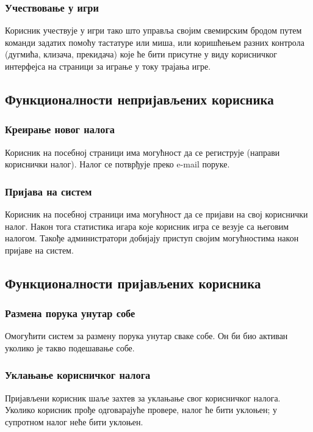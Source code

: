 \subsubsection{Учествовање у игри}
Корисник учествује у игри тако што управља својим свемирским бродом путем команди задатих помоћу тастатуре или
миша, или коришћењем разних контрола (дугмића, клизача, прекидача) које ће бити присутне у виду корисничког
интерфејса на страници за играње у току трајања игре.

\subsection{Функционалности непријављених корисника}

\subsubsection{Креирање новог налога} 
Корисник на посебној страници има могућност да се региструје (направи кориснички налог).
Налог се потврђује преко e-mail поруке.

\subsubsection{Пријава на систем}
Корисник на посебној страници има могућност да се пријави на свој кориснички налог.
Након тога статистика игара које корисник игра се везује са његовим налогом. 
Такође администратори добијају приступ својим могућностима након пријаве на систем.

\subsection{Функционалности пријављених корисника}

\subsubsection{Размена порука унутар собе}
Омогућити систем за размену порука унутар сваке собе. Он би био активан уколико је такво подешавање собе.

\subsubsection{Уклањање корисничког налога}
Пријављени корисник шаље захтев за уклањање свог корисничког налога. Уколико корисник прође одговарајуће провере,
налог ће бити уклоњен; у супротном налог неће бити уклоњен.


